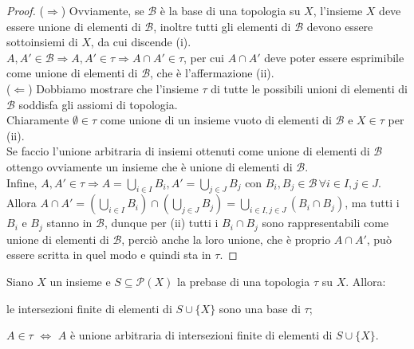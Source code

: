 \documentclass{article}
\begin{document}
\begin{proof}
	($\Rightarrow$) Ovviamente, se $\mathcal{B}$ è la base di una topologia su $X$, l'insieme $X$ deve essere unione di elementi di $\mathcal{B}$, inoltre tutti gli elementi di $\mathcal{B}$ devono essere sottoinsiemi di $X$, da cui discende (i). \\
	$A, A' \in \mathcal{B} \Rightarrow A, A' \in \tau \Rightarrow A \cap A' \in \tau$, per cui $A \cap A'$ deve poter essere esprimibile come unione di elementi di $\mathcal{B}$, che è l'affermazione (ii). \\
	($\Leftarrow$) Dobbiamo mostrare che l'insieme $\tau$ di tutte le possibili unioni di elementi di $\mathcal{B}$ soddisfa gli assiomi di topologia. \\
	Chiaramente $\emptyset \in \tau$ come unione di un insieme vuoto di elementi di $\mathcal{B}$ e $X \in \tau$ per (ii). \\
	Se faccio l'unione arbitraria di insiemi ottenuti come unione di elementi di $\mathcal{B}$ ottengo ovviamente un insieme che è unione di elementi di $\mathcal{B}$. \\
	Infine, $\displaystyle A, A' \in \tau \Rightarrow A=\bigcup_{i \in I} B_i, A'=\bigcup_{j \in J} B_j$ con $B_i, B_j \in \mathcal{B} \, \forall i \in I, j \in J$. Allora $\displaystyle A \cap A'= \left(\bigcup_{i \in I} B_i \right) \cap \left(\bigcup_{j \in J} B_j \right)=\bigcup_{i \in I, j \in J} (B_i \cap B_j)$, ma tutti i $B_i$ e $B_j$ stanno in $\mathcal{B}$, dunque per (ii) tutti i $B_i \cap B_j$ sono rappresentabili come unione di elementi di $\mathcal{B}$, perciò anche la loro unione, che è proprio $A \cap A'$, può essere scritta in quel modo e quindi sta in $\tau$.
\end{proof}

\begin{prop} \label{prop:preb}
	Siano $X$ un insieme e $S \subseteq \mathcal{P}(X)$ la prebase di una topologia $\tau$ su $X$. Allora:
	\begin{nlist}
		\item le intersezioni finite di elementi di $S \cup \{X\}$ sono una base di $\tau$;
		\item $A \in \tau$ $\Leftrightarrow$ $A$ è unione arbitraria di intersezioni finite di elementi di $S \cup \{X\}$.
	\end{nlist}
\end{prop}
\end{document}
